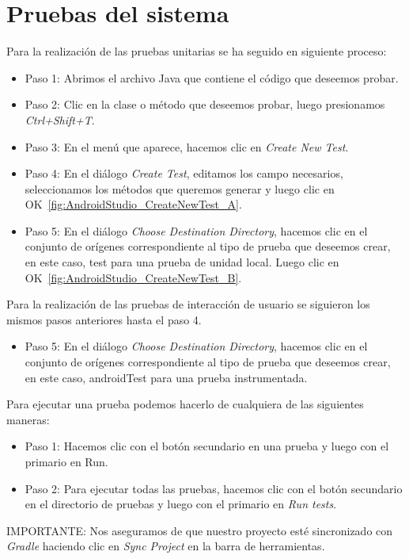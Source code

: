\section{Pruebas del sistema}
Para la realización de las pruebas unitarias se ha seguido en siguiente proceso:
\begin{itemize}
	\item Paso 1: Abrimos el archivo Java que contiene el código que deseemos probar.
	\item Paso 2: Clic en la clase o método que deseemos probar, luego presionamos \textit{Ctrl+Shift+T}.
	\item Paso 3: En el menú que aparece, hacemos clic en \textit{Create New Test}.
	\item Paso 4: En el diálogo \textit{Create Test}, editamos los campo necesarios, seleccionamos los métodos que queremos generar y luego clic en OK~\ref{fig:AndroidStudio_CreateNewTest_A}.
	\item Paso 5: En el diálogo \textit{Choose Destination Directory}, hacemos clic en el conjunto de orígenes correspondiente al tipo de prueba que deseemos crear, en este caso, test para una prueba de unidad local. Luego clic en OK~\ref{fig:AndroidStudio_CreateNewTest_B}.
	
\end{itemize}
Para la realización de las pruebas de interacción de usuario se siguieron los mismos pasos anteriores hasta el paso 4.
\begin{itemize}
	\item Paso 5: En el diálogo \textit{Choose Destination Directory}, hacemos clic en el conjunto de orígenes correspondiente al tipo de prueba que deseemos crear, en este caso, androidTest para una prueba instrumentada.
\end{itemize}

Para ejecutar una prueba podemos hacerlo de cualquiera de las siguientes maneras:
\begin{itemize}
	\item Paso 1: Hacemos clic con el botón secundario en una prueba y luego con el primario en Run.
	\item Paso 2: Para ejecutar todas las pruebas, hacemos clic con el botón secundario en el directorio de pruebas y luego con el primario en \textit{Run tests}.
\end{itemize}
IMPORTANTE: Nos aseguramos de que nuestro proyecto esté sincronizado con \textit{Gradle} haciendo clic en \textit{Sync Project} en la barra de herramientas.